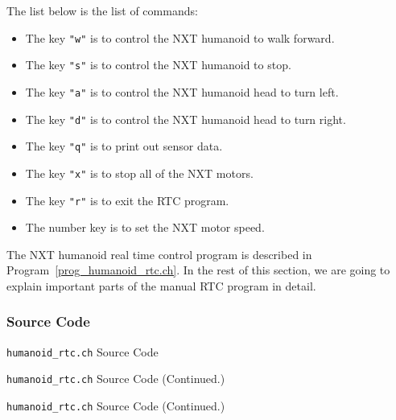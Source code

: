 \documentclass[11pt]{article}
\begin{document}
The list below is the list of commands:
\begin{itemize}
\item The key \verb+"w"+ is to control the NXT humanoid to walk forward.
\item The key \verb+"s"+ is to control the NXT humanoid to stop.
\item The key \verb+"a"+ is to control the NXT humanoid head to turn left.
\item The key \verb+"d"+ is to control the NXT humanoid head to turn right.
\item The key \verb+"q"+ is to print out sensor data.
\item The key \verb+"x"+ is to stop all of the NXT motors.
\item The key \verb+"r"+ is to exit the RTC program.
\item The number key is to set the NXT motor speed.
\end{itemize}

The NXT humanoid real time control program is described in Program~\ref{prog_humanoid_rtc.ch}. 
In the rest of this section, we are going to explain important parts of the manual RTC program in detail.

\subsubsection*{Source Code}

\begin{Program}[H]
    {\small}
    \caption{\texttt{humanoid\_rtc.ch} Source Code\label{prog_humanoid_rtc.ch}}
\end{Program}
\addtocounter{Program}{-1}
\begin{Program}[H]
    {\small}
    \caption{\texttt{humanoid\_rtc.ch} Source Code (Continued.)\label{prog_humanoid_rtc.ch}}
\end{Program}
\addtocounter{Program}{-1}
\begin{Program}[H]
    {\small}
    \caption{\texttt{humanoid\_rtc.ch} Source Code (Continued.)\label{prog_humanoid_rtc.ch}}
\end{Program}
\end{document}
